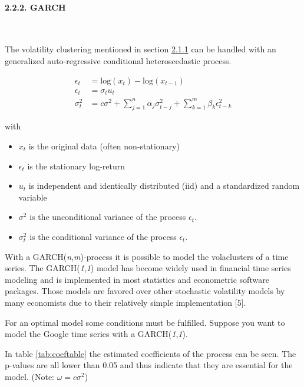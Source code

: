 \documentclass[
]{article}
\providecommand{\tightlist}{%
  \setlength{\itemsep}{0pt}\setlength{\parskip}{0pt}}
\begin{document}
\hypertarget{garch-section}{%
\paragraph{2.2.2. GARCH}\label{garch-section}}

~

The volatility clustering mentioned in section
\protect\hyperlink{stationarity}{2.1.1} can be handled with an
generalized auto-regressive conditional heteroscedastic process.

\begin{align} \label{eq:garch}
  \epsilon_{t} &= \mathrm{log}(x_{t})-\mathrm{log}(x_{t-1}) \nonumber \\
  \epsilon_{t} &= \sigma_{t}u_{t} \\
  \sigma_{t}^{2} &=c \sigma^{2}+\sum_{j=1}^{n}\alpha_{j}\sigma_{t-j}^{2}+\sum_{k=1}^{m}\beta_{k}\epsilon_{t-k}^{2} \nonumber
\end{align}

with

\begin{itemize}
\tightlist
\item
  \(x_{t}\) is the original data (often non-stationary)
\item
  \(\epsilon_{t}\) is the stationary log-return
\item
  \(u_{t}\) is independent and identically distributed (iid) and a
  standardized random variable
\item
  \(\sigma^{2}\) is the unconditional variance of the process
  \(\epsilon_{t}\).
\item
  \(\sigma_{t}^{2}\) is the conditional variance of the process
  \(\epsilon_{t}\).
\end{itemize}

With a GARCH(\emph{n},\emph{m})-process it is possible to model the
volaclusters of a time series. The GARCH(\emph{1},\emph{1}) model has
become widely used in financial time series modeling and is implemented
in most statistics and econometric software packages. Those models are
favored over other stochastic volatility models by many economists due
to their relatively simple implementation {[}5{]}.

\newpage

For an optimal model some conditions must be fulfilled. Suppose you want
to model the Google time series with a GARCH(\emph{1},\emph{1}).

In table \ref{tab:coeftable} the estimated coefficients of the process
can be seen. The p-values are all lower than 0.05 and thus indicate that
they are essential for the model. (Note: \(\omega=c\sigma^{2}\))
\end{document}
